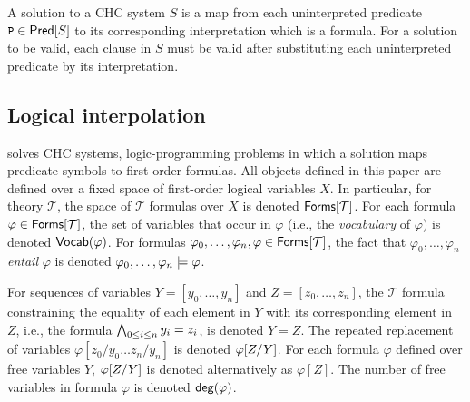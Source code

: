 A solution to a CHC system $S$ is a map from each uninterpreted
predicate $\cc{P} \in \predof{S}$ to its corresponding interpretation
which is a formula.
%
For a solution to be valid, each clause in $S$ must be valid after
substituting each uninterpreted predicate by its interpretation.

\subsection{Logical interpolation}
\label{sec:itps}
%
\sys solves CHC systems, logic-programming problems in which a
solution maps predicate symbols to first-order formulas.
%
All objects defined in this paper are defined over a fixed space of
first-order logical variables $X$.
%
In particular, for theory $\mathcal{T}$, the space of $\mathcal{T}$
formulas over $X$ is denoted $\tformulas{\mathcal{T}}$.
%
For each formula $\varphi \in \tformulas{\mathcal{T}}$, the set of
variables that occur in $\varphi$ (i.e., the \emph{vocabulary} of
$\varphi$) is denoted $\vocab(\varphi)$.
For formulas $\varphi_0, \ldots, \varphi_n, \varphi \in
\tformulas{\mathcal{T}}$, the fact that $\varphi_0, \ldots, \varphi_n$
\emph{entail} $\varphi$ is denoted $\varphi_0, \ldots, \varphi_n
\entails \varphi$.

For sequences of variables $Y = [ y_0, \ldots, y_n ]$ and $Z = [ z_0,
\ldots, z_n ]$, the $\mathcal{T}$ formula constraining the equality of
each element in $Y$ with its corresponding element in $Z$, i.e., the
formula $\bigland_{0 \leq i \leq n} y_i = z_i$, is denoted $Y = Z$.
%
The repeated replacement of variables $\varphi[ z_0 / y_0 \ldots z_{n}
/ y_{n} ]$ is denoted $\replace{\varphi}{Y}{Z}$.
%
For each formula $\varphi$ defined over free variables $Y$,
$\replace{\varphi}{Y}{Z}$ is denoted alternatively as $\varphi[ Z ]$.
%
The number of free variables in formula $\varphi$ is denoted
$\degreeof{\varphi}$.

